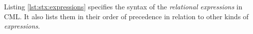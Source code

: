 Listing \ref{lst:stx:expressions} specifies the syntax of
the \emph{relational expressions} in CML.
It also lists them in their order of precedence
in relation to other kinds of \emph{expressions}.
